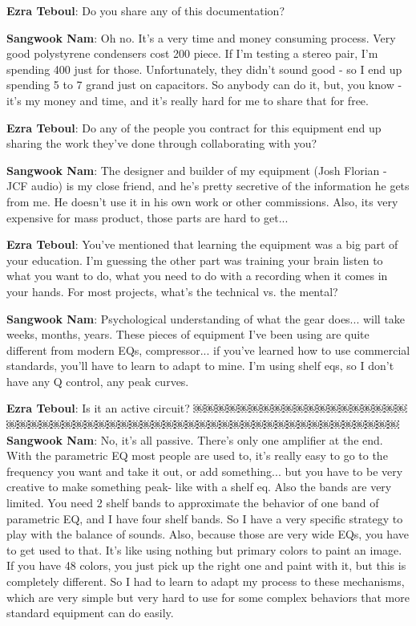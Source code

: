 \textbf{Ezra Teboul}: Do you share any of this documentation?

\textbf{Sangwook Nam}: Oh no. It's a very time and money consuming process. Very good polystyrene condensers cost 200 piece. If I'm testing a stereo pair, I'm spending 400 just for those. Unfortunately, they didn't sound good - so I end up spending 5 to 7 grand just on capacitors. So anybody can do it, but, you know - it's my money and time, and it's really hard for me to share that for free.

\textbf{Ezra Teboul}: Do any of the people you contract for this equipment end up sharing the work they've done through collaborating with you?

\textbf{Sangwook Nam}: The designer and builder of my equipment (Josh Florian - JCF audio) is my close friend, and he's pretty secretive of the information he gets from me. He doesn't use it in his own work or other commissions. Also, its very expensive for mass product, those parts are hard to get...

\textbf{Ezra Teboul}: You've mentioned that learning the equipment was a big part of your education. I'm guessing the other part was training your brain listen to what you want to do, what you need to do with a recording when it comes in your hands. For most projects, what's the technical vs. the mental?

\textbf{Sangwook Nam}: Psychological understanding of what the gear does... will take weeks, months, years. These pieces of equipment I've been using are quite different from modern EQs, compressor... if you've learned how to use commercial standards, you'll have to learn to adapt to mine. I'm using shelf eqs, so I don't have any Q control, any peak curves.

\textbf{Ezra Teboul}: Is it an active circuit?
￼￼￼￼￼￼￼￼￼￼￼￼￼￼￼￼￼￼￼￼￼￼￼￼￼￼￼￼￼￼￼￼￼￼￼￼￼￼￼￼￼￼￼￼￼￼￼￼￼￼￼￼￼￼
\textbf{Sangwook Nam}: No, it's all passive. There's only one amplifier at the end. With the parametric EQ most people are used to, it's really easy to go to the frequency you want and take it out, or add something... but you have to be very creative to make something peak- like with a shelf eq. Also the bands are very limited. You need 2 shelf bands to approximate the behavior of one band of parametric EQ, and I have four shelf bands. So I have a very specific strategy to play with the balance of sounds. Also, because those are very wide EQs, you have to get used to that. It's like using nothing but primary colors to paint an image. If you have 48 colors, you just pick up the right one and paint with it, but this is completely different. So I had to learn to adapt my process to these mechanisms, which are very simple but very hard to use for some complex behaviors that more standard equipment can do easily.


